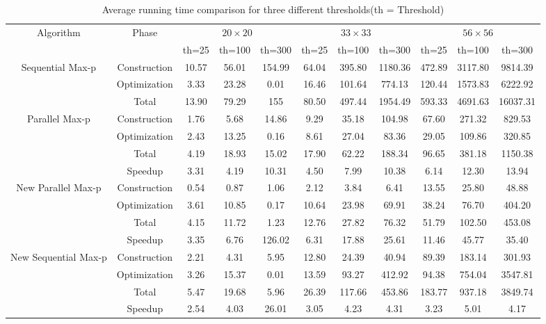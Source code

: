 \documentclass[conference]{IEEEtran}
\begin{document}
\begin{table}[!htbp]
\begin{center}
\begin{tabular}{|c|c|c|c|c|c|c|c|c|c|c|}
\hline 
\multirow{2}{*}{Algorithm}&\multirow{2}{*}{Phase} & \multicolumn{3}{|c|}{$20\times 20$} & \multicolumn{3}{|c|}{$33\times33$} & \multicolumn{3}{|c|}{$56\times56$}\\
\cline{3-11}
	& & th=25 & th=100 & th=300  & th=25 & th=100 & th=300  & th=25 & th=100 & th=300\\
\cline{1-11}
\multirow{3}{*}{Sequential Max-p}& Construction  & 10.57& 56.01 & 154.99 & 64.04 & 395.80 &1180.36 &472.89 &3117.80 &9814.39 \\
\cline{2-11}
 & Optimization& 3.33 & 23.28 & 0.01 & 16.46 & 101.64 &774.13 &120.44 &1573.83 &6222.92 \\
\cline{2-11}
 & Total& 13.90 & 79.29 & 155 & 80.50 & 497.44 &1954.49 &593.33 &4691.63 &16037.31\\
\hline
\hline

\multirow{4}{*}{Parallel Max-p}  &Construction& 1.76& 5.68 & 14.86 & 9.29 & 35.18 &104.98 &67.60 &271.32 &829.53\\
\cline{2-11}
 & Optimization& 2.43 & 13.25 & 0.16 & 8.61 & 27.04 &83.36 &29.05 &109.86&320.85 \\
\cline{2-11}
 & Total& 4.19 & 18.93 & 15.02 & 17.90 & 62.22 &188.34 &96.65 &381.18&1150.38 \\
\cline{2-11}
 & Speedup& 3.31 & 4.19 & 10.31 & 4.50 & 7.99 &10.38 &6.14 &12.30 &13.94\\
\hline
\hline

\multirow{4}{*}{New Parallel Max-p} &Construction & 0.54& 0.87 & 1.06 & 2.12 & 3.84 &6.41 &13.55 &25.80&48.88 \\
\cline{2-11}
 & Optimization& 3.61 & 10.85 & 0.17 & 10.64 &23.98 &69.91 &38.24&76.70 & 404.20 \\
\cline{2-11}
 & Total& 4.15 & 11.72 & 1.23 & 12.76 &27.82 &76.32 &51.79 &102.50 & 453.08\\
\cline{2-11}
 & Speedup& 3.35 & 6.76 & 126.02 & 6.31 & 17.88 &25.61 &11.46 &45.77 &35.40\\
\hline
\hline

\multirow{4}{*}{New Sequential Max-p} &Construction & 2.21& 4.31 & 5.95 & 12.80 & 24.39 &40.94 &89.39 &183.14&301.93 \\
\cline{2-11}
 & Optimization& 3.26 & 15.37 & 0.01 & 13.59 & 93.27 &412.92 &94.38 & 754.04 & 3547.81 \\
\cline{2-11}
 & Total& 5.47 & 19.68 & 5.96 & 26.39 & 117.66 &453.86 &183.77 &937.18 &3849.74\\
\cline{2-11}
 & Speedup& 2.54 & 4.03 & 26.01 & 3.05 & 4.23 &4.31 &3.23 &5.01 &4.17\\
\hline

\end{tabular}
\caption{Average running time comparison for three different thresholds(th = Threshold)}
\label{tab:tab4}
\end{center}
\end{table}
\end{document}
